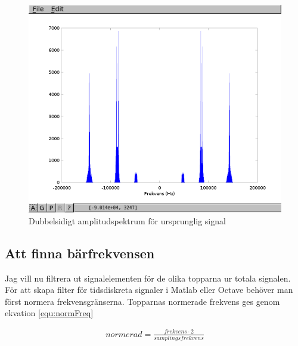 \documentclass[a4paper,12pt,fleqn]{article}
\begin{document}
\begin{figure}[htp]
  \begin{center}
  \includegraphics[keepaspectratio=true,width=\linewidth]{fft_orig_data.png}  %
  \end{center}
  \caption{Dubbelsidigt amplitudspektrum för ursprunglig signal} %
  \label{fig:fft_orig_data}
\end{figure}
\newpage

\subsection{Att finna bärfrekvensen}

Jag vill nu filtrera ut signalelementen för de olika topparna ur totala signalen. För att skapa filter för tidsdiskreta signaler i Matlab eller Octave behöver man först normera frekvensgränserna. Topparnas normerade frekvens ges genom ekvation \ref{equ:normFreq}

\begin{gather}
normerad = \frac{frekvens \cdot 2}{samplingsfrekvens}
\label{equ:normFreq}
\end{gather}
\end{document}
